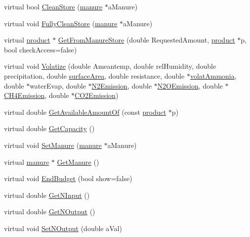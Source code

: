 \begin{DoxyCompactItemize}
\item 
virtual bool \hyperlink{classmanurestore_ac9c341a4ec87983d1b44c9c4b05c93a2}{CleanStore} (\hyperlink{classmanure}{manure} $\ast$aManure)
\item 
virtual void \hyperlink{classmanurestore_a079653ec01b9b278a16e9f03eccd73e9}{FullyCleanStore} (\hyperlink{classmanure}{manure} $\ast$aManure)
\item 
virtual \hyperlink{classproduct}{product} $\ast$ \hyperlink{classmanurestore_a0cf324021067f2433337600801c36a59}{GetFromManureStore} (double RequestedAmount, \hyperlink{classproduct}{product} $\ast$p, bool checkAccess=false)
\item 
virtual void \hyperlink{classmanurestore_a20c064bc22937610b638ba0a27c77e62}{Volatize} (double Ameantemp, double relHumidity, double precipitation, double \hyperlink{classmanurestore_a061d3a49dadcf3d8de36417c7cf125d3}{surfaceArea}, double resistance, double $\ast$\hyperlink{classmanurestore_ac9d398e432684fb02bfaf52c2f0e9ae8}{volatAmmonia}, double $\ast$waterEvap, double $\ast$\hyperlink{classmanurestore_a9a8d525f55145b43f2ab275fb9b5f35f}{N2Emission}, double $\ast$\hyperlink{classmanurestore_aca5ad359219f1f6c9a957f03156136ab}{N2OEmission}, double $\ast$\hyperlink{classmanurestore_ae472072caaaea49932fe2152e6a4fb09}{CH4Emission}, double $\ast$\hyperlink{classmanurestore_aebc6ae97114292e973c57cbc2ecc4f84}{CO2Emission})
\item 
virtual double \hyperlink{classmanurestore_a2de53bf7077d84143c1014b1716c9bd8}{GetAvailableAmountOf} (const \hyperlink{classproduct}{product} $\ast$p)
\item 
virtual double \hyperlink{classmanurestore_a154c66c6ccb49a2b8f40554f9a9d24b5}{GetCapacity} ()
\item 
virtual void \hyperlink{classmanurestore_a613b4feef4fa58c5586b6d9e0dd2a723}{SetManure} (\hyperlink{classmanure}{manure} $\ast$aManure)
\item 
virtual \hyperlink{classmanure}{manure} $\ast$ \hyperlink{classmanurestore_a0ed157b3552bad31bf7a242eba189751}{GetManure} ()
\item 
virtual void \hyperlink{classmanurestore_aedd7bc72a5ce5d60612c29218cdc1753}{EndBudget} (bool show=false)
\item 
virtual double \hyperlink{classmanurestore_aa7e2c487fa0520a26a817a9a2dd904df}{GetNInput} ()
\item 
virtual double \hyperlink{classmanurestore_a7425c8a0bf3e94d8326f1fe9e091f422}{GetNOutput} ()
\item 
virtual void \hyperlink{classmanurestore_a848644e21710c45320e36e8121232e0f}{SetNOutput} (double aVal)

\end{DoxyCompactItemize}
